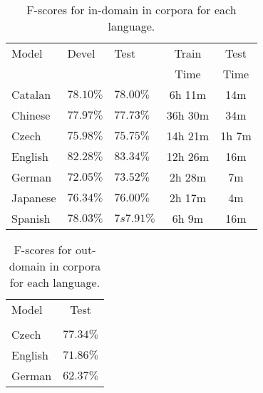 \begin{table}
\begin{center}
\small
\begin{tabular}{|l|l|l|c|c|}\hline
Model           & Devel        & Test       & Train   & Test  \\
                &              &            & Time    & Time  \\\hline\hline
Catalan         & $78.10\%$    & $78.00\%$  & 6h 11m  & 14m   \\ %
Chinese         & $77.97\%$    & $77.73\%$  & 36h 30m & 34m   \\ %
Czech           & $75.98\%$    & $75.75\%$  & 14h 21m & 1h 7m \\ %
English         & $82.28\%$    & $83.34\%$  & 12h 26m & 16m   \\ %
German          & $72.05\%$    & $73.52\%$  & 2h 28m  & 7m    \\ %
Japanese        & $76.34\%$    & $76.00\%$  & 2h 17m  & 4m    \\ %
Spanish         & $78.03\%$    & $7s7.91\%$  & 6h 9m   & 16m   \\ %
\hline
\end{tabular}
\caption{F-scores for in-domain in corpora for each language.}
\label{tbl:results}
\normalsize
\end{center}
\end{table}

\begin{table}
\begin{center}
\small
\begin{tabular}{|l|c|}\hline
Model           & Test       \\
                &            \\\hline\hline
Czech           & $77.34\%$  \\ 
English         & $71.86\%$  \\
German          & $62.37\%$  \\
\hline
\end{tabular}
\caption{F-scores for out-domain in corpora for each language.}
\label{tbl:results}
\normalsize
\end{center}
\end{table}






